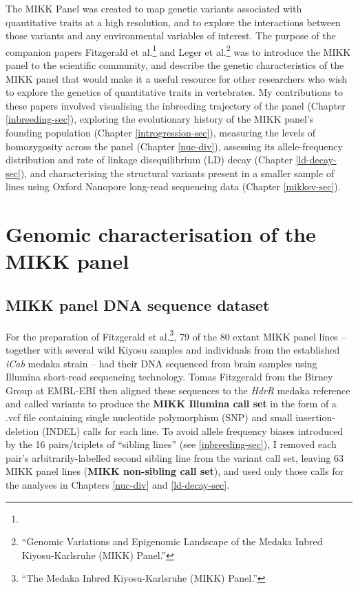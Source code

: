 \documentclass[
]{book}
\begin{document}
The MIKK Panel was created to map genetic variants associated with quantitative traits at a high resolution, and to explore the interactions between those variants and any environmental variables of interest. The purpose of the companion papers Fitzgerald et al.\footnote{} and Leger et al.\footnote{{``Genomic Variations and Epigenomic Landscape of the {Medaka Inbred Kiyosu-Karlsruhe} ({MIKK}) Panel.''}} was to introduce the MIKK panel to the scientific community, and describe the genetic characteristics of the MIKK panel that would make it a useful resource for other researchers who wish to explore the genetics of quantitative traits in vertebrates. My contributions to these papers involved visualising the inbreeding trajectory of the panel (Chapter \ref{inbreeding-sec}),
exploring the evolutionary history of the MIKK panel's founding population (Chapter \ref{introgression-sec}), measuring the levels of homozygosity across the panel (Chapter \ref{nuc-div}), assessing its allele-frequency distribution and rate of linkage disequilibrium (LD) decay (Chapter \ref{ld-decay-sec}), and characterising the structural variants present in a smaller sample of lines using Oxford Nanopore long-read sequencing data (Chapter \ref{mikksv-sec}).

\hypertarget{genomic-characterisation-of-the-mikk-panel}{%
\section{Genomic characterisation of the MIKK panel}\label{genomic-characterisation-of-the-mikk-panel}}

\hypertarget{non-sib-calls}{%
\subsection{MIKK panel DNA sequence dataset}\label{non-sib-calls}}

For the preparation of Fitzgerald et al.\footnote{{``The {Medaka Inbred Kiyosu-Karlsruhe} ({MIKK}) Panel.''}}, 79 of the 80 extant MIKK panel lines -- together with several wild Kiyosu samples and individuals from the established \emph{iCab} medaka strain -- had their DNA sequenced from brain samples using Illumina short-read sequencing technology. Tomas Fitzgerald from the Birney Group at EMBL-EBI then aligned these sequences to the \emph{HdrR} medaka reference and called variants to produce the \textbf{MIKK Illumina call set} in the form of a .vcf file containing single nucleotide polymorphism (SNP) and small insertion-deletion (INDEL) calls for each line. To avoid allele frequency biases introduced by the 16 pairs/triplets of ``sibling lines'' (see \ref{inbreeding-sec}), I removed each pair's arbitrarily-labelled second sibling line from the variant call set, leaving 63 MIKK panel lines (\textbf{MIKK non-sibling call set}), and used only those calls for the analyses in Chapters \ref{nuc-div} and \ref{ld-decay-sec}.
\end{document}
